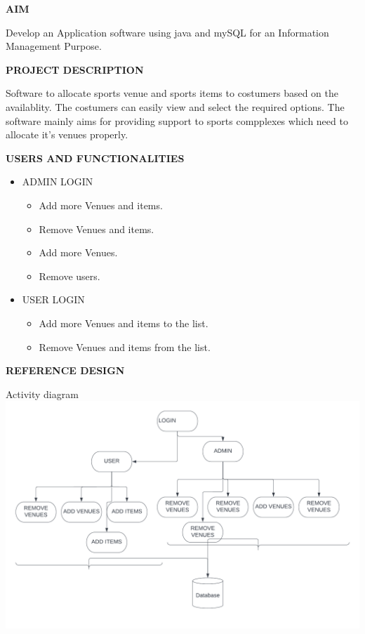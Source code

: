 \documentclass[a4paper,12pt]{report}
\begin{document}
\begin{flushleft}
	\textbf{AIM}
\end{flushleft}
Develop an Application software using java and mySQL for an Information Management
Purpose.
\begin{flushleft}
    \textbf{PROJECT DESCRIPTION}
\end{flushleft}
Software to allocate sports venue and sports items to costumers based on the availablity. The costumers can easily view and select the required options. The software mainly aims
for providing support to sports compplexes which need to allocate it's venues properly.
	\begin{flushleft}
		\textbf{USERS AND FUNCTIONALITIES }
	\end{flushleft}
\begin{itemize}
 \item  ADMIN LOGIN
 \begin{itemize}
 	\item  Add more Venues and items.
 	\item  Remove Venues and items.
 	\item  Add more Venues.
 	\item  Remove users.
 \end{itemize}
	\item USER LOGIN
	 \begin{itemize}
		\item  Add more Venues and items to the list.
		\item  Remove Venues and items from the list.
	\end{itemize}
\end{itemize}
\begin{flushleft}
		\textbf{REFERENCE DESIGN} 
\end{flushleft} 
\big Activity diagram
\\
\includegraphics[scale=.5]{ACTIVITY.png}
\newline
\end{document}
